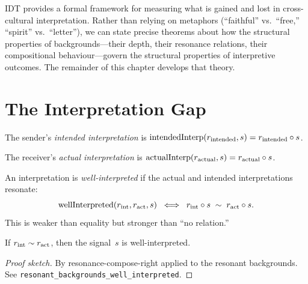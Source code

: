 IDT provides a formal framework for measuring what is gained and lost
in cross-cultural interpretation.  Rather than relying on metaphors
(``faithful'' vs.\ ``free,'' ``spirit'' vs.\ ``letter''), we can state
precise theorems about how the structural properties of backgrounds---their
depth, their resonance relations, their compositional behaviour---govern
the structural properties of interpretive outcomes.  The remainder of
this chapter develops that theory.

\section{The Interpretation Gap}
\label{sec:ch5:gap}

\begin{definition}
\label{def:intended-interp}
The sender's \emph{intended interpretation} is
$\operatorname{intendedInterp}(r_{\mathrm{intended}}, s)
 = r_{\mathrm{intended}} \circ s$.
\end{definition}

\begin{definition}
\label{def:actual-interp}
The receiver's \emph{actual interpretation} is
$\operatorname{actualInterp}(r_{\mathrm{actual}}, s)
 = r_{\mathrm{actual}} \circ s$.
\end{definition}

\begin{definition}
\label{def:well-interpreted}
An interpretation is \emph{well-interpreted} if the actual and intended
interpretations resonate:
\[
  \operatorname{wellInterpreted}(r_{\mathrm{int}}, r_{\mathrm{act}}, s)
  \;\iff\;
  r_{\mathrm{int}} \circ s \;\sim\; r_{\mathrm{act}} \circ s.
\]
This is weaker than equality but stronger than ``no relation.''
\end{definition}

\begin{theorem}
\label{thm:resonant-well-interpreted}
If $r_{\mathrm{int}} \sim r_{\mathrm{act}}$, then the signal~$s$ is
well-interpreted.
\end{theorem}

\begin{proof}[Proof sketch]
By resonance-compose-right applied to the resonant backgrounds.
See \texttt{resonant\_backgrounds\_well\_interpreted}.
\end{proof}

